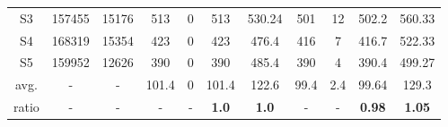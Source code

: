 \documentclass[12pt]{spieman}
\theoremstyle{plain}
\begin{document}
\begin{spacing}{1}
\begin{table*}[htb]
{\begin{tabular}{|c|c|c |c|c|c|c||c|c|c|c||}
 S3           &157455  &15176      &513   &0   &513   &530.24      &501   &12  &502.2  &560.33 \\ 
 S4           &168319  &15354      &423   &0   &423   &476.4       &416   &7   &416.7  &522.33 \\ 
 S5           &159952  &12626      &390   &0   &390   &485.4       &390   &4   &390.4  &499.27 \\ 
 \hline
 avg.         &-       &-          &101.4 &0   &101.4 &122.6       &99.4  &2.4 &99.64  &129.3  \\
 \hline
 ratio        &-       &-          &-	    &-    &\textbf{1.0}   &\textbf{1.0}
                                   &-     &-    &\textbf{0.98}  &\textbf{1.05}\\

 \hline \hline
\end{tabular}
}
\end{table*}
\fi


\end{spacing}
\end{document}

